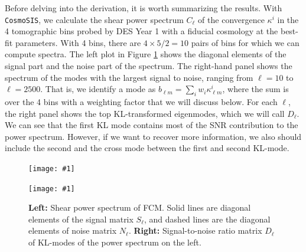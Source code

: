\documentclass[twocolumn]{\docclass}
\newcommand{\sfig}[2]{
	\texttt{[image: \#1]}
}
\newcommand{\rf}[1]{Figure \ref{fig:#1}}
\newcommand\full{FCM}
\begin{document}
	Before delving into the derivation, it is worth summarizing the results. With {\tt CosmoSIS}, we calculate the shear power spectrum $C_{\ell}$ of the convergence $\kappa^i$ in the 4 tomographic bins probed by DES Year 1 with a fiducial cosmology at the best-fit parameters. With 4 bins, there are $4\times 5/2=10$ pairs of bins for which we can compute spectra. The left plot in \rf{ClDl} shows the diagonal elements of the signal part and the noise part of the spectrum. The right-hand panel shows the spectrum of the modes with the largest signal to noise, ranging from $\ell = 10$ to $\ell = 2500$. That is, we identify a mode as $b_{\ell m} = \sum_i w_i \kappa_{\ell m}^i$, where the sum is over the 4 bins with a weighting factor that we will discuss below. For each $\ell$, the right panel shows the top KL-transformed eigenmodes, which we will call $D_{\ell}$. We can see that the first KL mode contains most of the SNR contribution to the power spectrum. However, if we want to recover more information, we also should include the second and the cross mode between the first and second KL-mode.
	
	\begin{figure}[thbp]
	    \sfig{figures/Cl_newrange.png}{0.8\columnwidth}
		\qquad \qquad \qquad
	    \sfig{figures/Dl_newrange.png}{0.8\columnwidth}
		\caption{\textbf{Left:} Shear power spectrum of \full. Solid lines are diagonal elements of the signal matrix $S_{\ell}$, and dashed lines are the diagonal elements of noise matrix $N_{\ell}$.
		\textbf{Right:} Signal-to-noise ratio matrix $D_\ell$ of KL-modes of the power spectrum on the left.  \label{fig:ClDl}}
	\end{figure}
	
\end{document}

